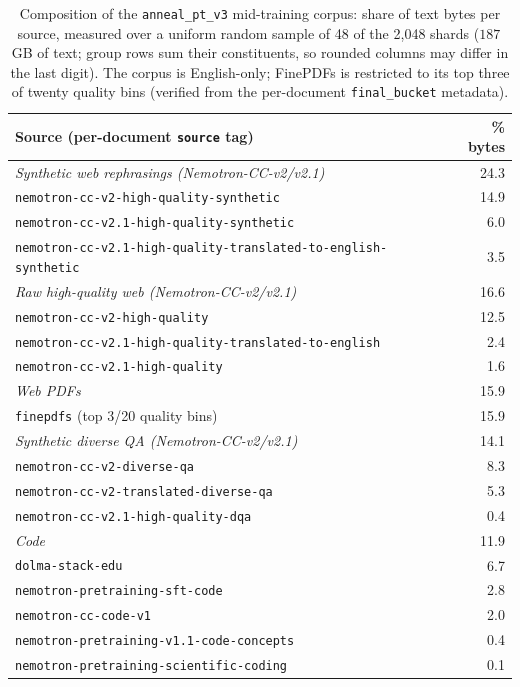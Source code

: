 \documentclass{article}
\begin{document}
\begin{table}[h]
\centering
\caption{Composition of the \texttt{anneal\_pt\_v3} mid-training corpus: share of
text bytes per source, measured over a uniform random sample of 48 of the 2{,}048
shards ($187$\,GB of text; group rows sum their constituents, so rounded columns
may differ in the last digit). The corpus is English-only; FinePDFs is restricted
to its top three of twenty quality bins (verified from the per-document
\texttt{final\_bucket} metadata).}
\label{tab:datamix}
\footnotesize
\begin{tabular}{lr}
\toprule
\textbf{Source (per-document \texttt{source} tag)} & \textbf{\% bytes} \\
\midrule
\emph{Synthetic web rephrasings (Nemotron-CC-v2/v2.1)} & 24.3 \\
\quad \texttt{nemotron-cc-v2-high-quality-synthetic} & 14.9 \\
\quad \texttt{nemotron-cc-v2.1-high-quality-synthetic} & 6.0 \\
\quad \texttt{nemotron-cc-v2.1-high-quality-translated-to-english-synthetic} & 3.5 \\
\midrule
\emph{Raw high-quality web (Nemotron-CC-v2/v2.1)} & 16.6 \\
\quad \texttt{nemotron-cc-v2-high-quality} & 12.5 \\
\quad \texttt{nemotron-cc-v2.1-high-quality-translated-to-english} & 2.4 \\
\quad \texttt{nemotron-cc-v2.1-high-quality} & 1.6 \\
\midrule
\emph{Web PDFs} & 15.9 \\
\quad \texttt{finepdfs} (top 3/20 quality bins) & 15.9 \\
\midrule
\emph{Synthetic diverse QA (Nemotron-CC-v2/v2.1)} & 14.1 \\
\quad \texttt{nemotron-cc-v2-diverse-qa} & 8.3 \\
\quad \texttt{nemotron-cc-v2-translated-diverse-qa} & 5.3 \\
\quad \texttt{nemotron-cc-v2.1-high-quality-dqa} & 0.4 \\
\midrule
\emph{Code} & 11.9 \\
\quad \texttt{dolma-stack-edu} & 6.7 \\
\quad \texttt{nemotron-pretraining-sft-code} & 2.8 \\
\quad \texttt{nemotron-cc-code-v1} & 2.0 \\
\quad \texttt{nemotron-pretraining-v1.1-code-concepts} & 0.4 \\
\quad \texttt{nemotron-pretraining-scientific-coding} & 0.1 \\

\end{tabular}
\end{table}
\end{document}
